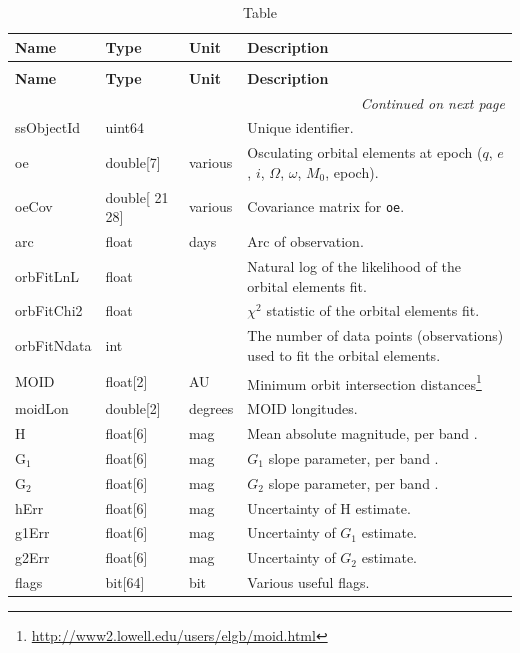 \documentclass[SE,lsstdraft,toc]{lsstdoc}
\newcommand{\oldtext}[1]{{\color{red} #1}}
\newcommand{\newtext}[1]{{\color{blue} #1}}
\newenvironment{schema}[3]{%
\setlength\LTleft{0pt}
\setlength\LTright{\fill}
\begin{longtable}{p{0.2\textwidth}p{0.14\textwidth}p{0.14\textwidth}p{0.41\textwidth}}

\caption[#1]{#2\label{#3}}\\

\hline \textbf{Name} & \textbf{Type} & \textbf{Unit} & \textbf{Description}\\ \hline
\endfirsthead

\caption[#1]{#2}\\

\hline \textbf{Name} & \textbf{Type} & \textbf{Unit} & \textbf{Description}\\ \hline
\endhead

\hline \multicolumn{4}{r}{\emph{Continued on next page}} \\
\endfoot

\hline\hline
\endlastfoot
}{%
\hline
\end{longtable}
}
\begin{document}
\begin{schema}{\SSObject Table}{\SSObject Table}{tbl:ssobjectTable}

ssObjectId & uint64 & ~ & Unique identifier. \\

oe & double[7] & various & Osculating orbital elements at epoch ($q$, $e$, $i$, $\Omega$, $\omega$, $M_0$, epoch). \\

oeCov & double[\oldtext{21}\newtext{28}] & various & Covariance matrix for \texttt{oe}. \\

arc & float & days & Arc of observation. \\

orbFitLnL & float & ~ & Natural log of the likelihood of the orbital elements fit. \\

orbFitChi2 & float & ~ & $\chi^2$ statistic of the orbital elements fit. \\

orbFitNdata & int & ~ & The number of data points (observations) used to fit the orbital elements. \\

MOID & float[2] & AU & Minimum orbit intersection distances\footnote{\url{http://www2.lowell.edu/users/elgb/moid.html}} \\

moidLon & double[2] & degrees & MOID longitudes. \\

H & float[6] & mag & Mean absolute magnitude, per band \citep[][magnitude-phase system]{2010Icar..209..542M}. \\

$\mathrm{G_1}$ & float[6] & mag & $G_1$ slope parameter, per band \citep[][magnitude-phase system]{2010Icar..209..542M}. \\

$\mathrm{G_2}$ & float[6] & mag & $G_2$ slope parameter, per band \citep[][magnitude-phase system]{2010Icar..209..542M}. \\

hErr & float[6] & mag & Uncertainty of H estimate.\\

g1Err & float[6] & mag & Uncertainty of $G_1$ estimate. \\

g2Err & float[6] & mag & Uncertainty of $G_2$ estimate. \\

flags & bit[64] & bit & Various useful flags. \\

\end{schema}
\end{document}
